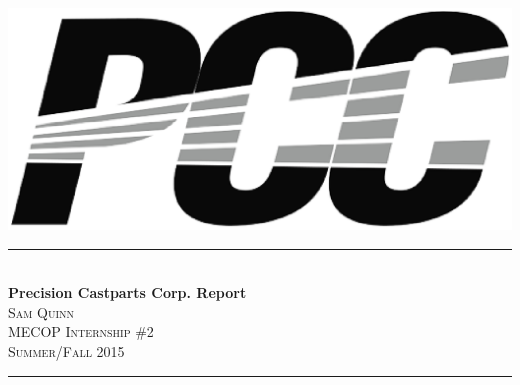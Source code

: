 \documentclass[letterpaper,10pt,notitlepage,fleqn]{article}
\begin{document}
\begin{titlepage}
\vspace*{\fill}

\newcommand{\HRule}{\rule{\linewidth}{0.5mm}} %

\center %


\includegraphics[scale=.5]{pcc.eps}
\HRule \\[0.4cm]
{ \huge \bfseries Precision Castparts Corp. Report}\\[0.4cm] %


\textsc{\LARGE Sam Quinn}\\[0.5cm] %
\textsc{\Large MECOP Internship \#2}\\[0.5cm] %
\textsc{\large Summer/Fall 2015}\\[0.5cm] %


\HRule \\[1.5cm]


\end{titlepage}
\end{document}
